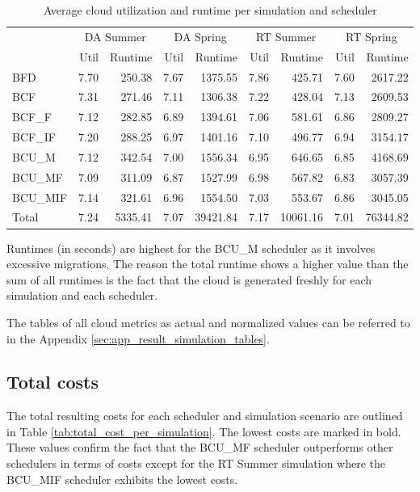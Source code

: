 \begin{table}[htbp]
\centering
\begin{tabular}{lrrrrrrrr}
\toprule
{} & \multicolumn{2}{c}{DA Summer} & \multicolumn{2}{c}{DA Spring} & \multicolumn{2}{c}{RT Summer} & \multicolumn{2}{c}{RT Spring} \\
{} &  Util &  Runtime &  Util &  Runtime &  Util &  Runtime &  Util &  Runtime \\
\midrule
BFD     &  7.70 &    250.38 &  7.67 &   1375.55 &  7.86 &    425.71 &  7.60 &   2617.22 \\
BCF     &  7.31 &    271.46 &  7.11 &   1306.38 &  7.22 &    428.04 &  7.13 &   2609.53 \\
BCF\_F   &  7.12 &    282.85 &  6.89 &   1394.61 &  7.06 &    581.61 &  6.86 &   2809.27 \\
BCF\_IF  &  7.20 &    288.25 &  6.97 &   1401.16 &  7.10 &    496.77 &  6.94 &   3154.17 \\
BCU\_M   &  7.12 &    342.54 &  7.00 &   1556.34 &  6.95 &    646.65 &  6.85 &   4168.69 \\
BCU\_MF  &  7.09 &    311.09 &  6.87 &   1527.99 &  6.98 &    567.82 &  6.83 &   3057.39 \\
BCU\_MIF &  7.14 &    321.61 &  6.96 &   1554.50 &  7.03 &    553.67 &  6.86 &   3045.05 \\
\bottomrule
Total   &  7.24 &       5335.41 &  7.07 &  39421.84 &  7.17 &  10061.16 &  7.01 &  76344.82 \\
\bottomrule
\end{tabular}
\caption{Average cloud utilization and runtime per simulation and scheduler}
\label{tab:utilization_and_runtimes}
\end{table}

Runtimes (in seconds) are highest for the BCU\_M scheduler as it involves excessive migrations. The reason the total runtime shows a higher value than the sum of all runtimes is the fact that the cloud is generated freshly for each simulation and each scheduler. 


The tables of all cloud metrics as actual and normalized values can be referred to in the Appendix \ref{sec:app_result_simulation_tables}. 




\subsection{Total costs}

The total resulting costs for each scheduler and simulation scenario are outlined in Table \ref{tab:total_cost_per_simulation}.
The lowest costs are marked in bold. 
These values confirm the fact that the BCU\_MF scheduler outperforms other schedulers in terms of costs except for the RT Summer simulation where the BCU\_MIF scheduler exhibits the lowest costs. 


